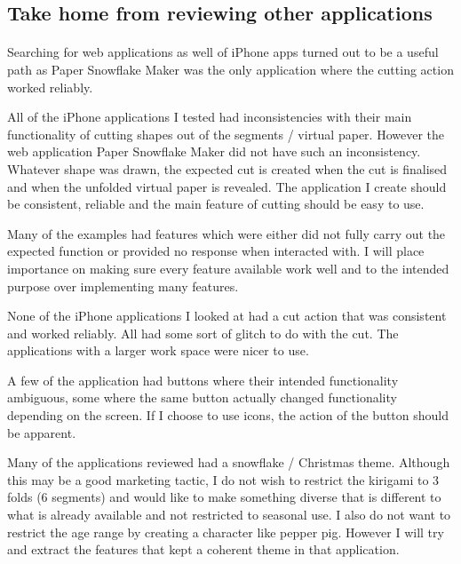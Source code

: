 \documentclass[11pt]{article}
\begin{document}
       \subsection{Take home from reviewing other applications}
       
            \paragraph{}
            Searching for web applications as well of iPhone apps turned out to be a useful path as Paper Snowflake Maker was the only application where the cutting action worked reliably.
            
            All of the iPhone applications I tested had inconsistencies with their main functionality of cutting shapes out of the segments / virtual paper. However the web application Paper Snowflake Maker did not have such an inconsistency. Whatever shape was drawn, the expected cut is created when the cut is finalised and when the unfolded virtual paper is revealed. The application I create should be consistent, reliable and the main feature of cutting should be easy to use.  
            
            Many of the examples had features which were either did not fully carry out the expected function or provided no response when interacted with. I will place importance on making sure every feature available work well and to the intended purpose over implementing many features. 
            
            None of the iPhone applications I looked at had a cut action that was consistent and worked reliably. All had some sort of glitch to do with the cut. The applications with a larger work space were nicer to use. 
            
            A few of the application had buttons where their intended functionality ambiguous, some where the same button actually changed functionality depending on the screen. If I choose to use icons, the action of the button should be apparent.
            
            Many of the applications reviewed had a snowflake / Christmas theme. Although this may be a good marketing tactic, I do not wish to restrict the kirigami to 3 folds (6 segments) and would like to make something diverse that is different to what is already available and not restricted to seasonal use. I also do not want to restrict the age range by creating a character like pepper pig. However I will try and extract the features that kept a coherent theme in that application.
            
\end{document}
